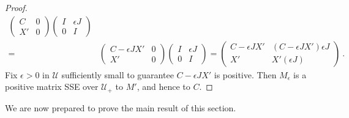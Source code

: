 \documentclass{amsart}
\theoremstyle{definition}
\theoremstyle{remark}
\numberwithin{equation}{section}
\begin{document}
{{\begin{proof}
\begin{align*}
\begin{pmatrix} C & 0 \\  X' & 0 \end{pmatrix} 
\begin{pmatrix} I & \epsilon J  \\ 0 & I \end{pmatrix} \\ 
=& 
\begin{pmatrix} C-\epsilon JX' & 0 \\  X' & 0 \end{pmatrix} 
\begin{pmatrix} I & \epsilon J  \\ 0 & I \end{pmatrix} 
= 
\begin{pmatrix} C-\epsilon JX' & (C-\epsilon JX')\epsilon J
 \\  
X' & X'(\epsilon J) \end{pmatrix} \ . 
\end{align*} 
Fix $\epsilon > 0$ in $\mathcal U$ sufficiently small to 
guarantee 
$C-\epsilon JX'$ is positive. Then 
$M_{\epsilon}$ is a positive matrix SSE over $\mathcal U_+$ to 
$M'$, and hence to $C$. 
\end{proof} 

We are now prepared to prove the main result of this section. 

}}
\end{document}
